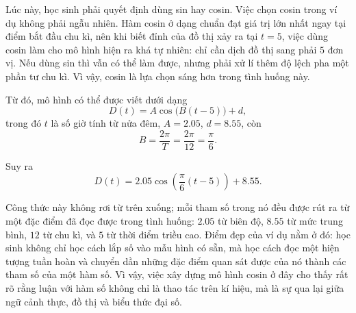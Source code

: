 {    Lúc này, học sinh phải quyết định dùng sin hay cosin. Việc chọn cosin trong ví dụ không phải ngẫu nhiên. Hàm cosin ở dạng chuẩn đạt giá trị lớn nhất ngay tại điểm bắt đầu chu kì, nên khi biết đỉnh của đồ thị xảy ra tại $t=5$, việc dùng cosin làm cho mô hình hiện ra khá tự nhiên: chỉ cần dịch đồ thị sang phải $5$ đơn vị. Nếu dùng sin thì vẫn có thể làm được, nhưng phải xử lí thêm độ lệch pha một phần tư chu kì. Vì vậy, cosin là lựa chọn sáng hơn trong tình huống này.

    Từ đó, mô hình có thể được viết dưới dạng
    $$
    D(t)=A\cos\bigl(B(t-5)\bigr)+d,
    $$
    trong đó $t$ là số giờ tính từ nửa đêm, $A=2.05$, $d=8.55$, còn
    $$
    B=\frac{2\pi}{T}=\frac{2\pi}{12}=\frac{\pi}{6}.
    $$

    Suy ra
    $$
    D(t)=2.05\cos\left(\frac{\pi}{6}(t-5)\right)+8.55.
    $$

    Công thức này không rơi từ trên xuống; mỗi tham số trong nó đều được rút ra từ một đặc điểm đã đọc được trong tình huống: $2.05$ từ biên độ, $8.55$ từ mức trung bình, $12$ từ chu kì, và $5$ từ thời điểm triều cao. Điểm đẹp của ví dụ nằm ở đó: học sinh không chỉ học cách lắp số vào mẫu hình có sẵn, mà học cách đọc một hiện tượng tuần hoàn và chuyển dần những đặc điểm quan sát được của nó thành các tham số của một hàm số. Vì vậy, việc xây dựng mô hình cosin ở đây cho thấy rất rõ rằng luận với hàm số không chỉ là thao tác trên kí hiệu, mà là sự qua lại giữa ngữ cảnh thực, đồ thị và biểu thức đại số.
  }

\TriPara
  {
  }
  {
  }{\NOTE{}}

\CloseGrid